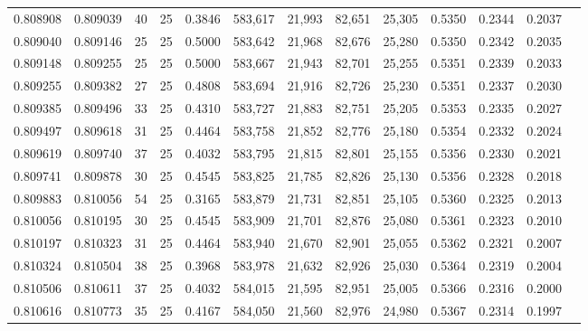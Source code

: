 \begin{tabular}{rrrrrrrrrrrrr}
0.808908 & 0.809039 &    40 &  25 &                                     0.3846 & 583,617 &  21,993 &  82,651 &  25,305 & 0.5350 & 0.2344 & 0.2037 \\
0.809040 & 0.809146 &    25 &  25 &                                     0.5000 & 583,642 &  21,968 &  82,676 &  25,280 & 0.5350 & 0.2342 & 0.2035 \\
0.809148 & 0.809255 &    25 &  25 &                                     0.5000 & 583,667 &  21,943 &  82,701 &  25,255 & 0.5351 & 0.2339 & 0.2033 \\
0.809255 & 0.809382 &    27 &  25 &                                     0.4808 & 583,694 &  21,916 &  82,726 &  25,230 & 0.5351 & 0.2337 & 0.2030 \\
0.809385 & 0.809496 &    33 &  25 &                                     0.4310 & 583,727 &  21,883 &  82,751 &  25,205 & 0.5353 & 0.2335 & 0.2027 \\
0.809497 & 0.809618 &    31 &  25 &                                     0.4464 & 583,758 &  21,852 &  82,776 &  25,180 & 0.5354 & 0.2332 & 0.2024 \\
0.809619 & 0.809740 &    37 &  25 &                                     0.4032 & 583,795 &  21,815 &  82,801 &  25,155 & 0.5356 & 0.2330 & 0.2021 \\
0.809741 & 0.809878 &    30 &  25 &                                     0.4545 & 583,825 &  21,785 &  82,826 &  25,130 & 0.5356 & 0.2328 & 0.2018 \\
0.809883 & 0.810056 &    54 &  25 &                                     0.3165 & 583,879 &  21,731 &  82,851 &  25,105 & 0.5360 & 0.2325 & 0.2013 \\
0.810056 & 0.810195 &    30 &  25 &                                     0.4545 & 583,909 &  21,701 &  82,876 &  25,080 & 0.5361 & 0.2323 & 0.2010 \\
0.810197 & 0.810323 &    31 &  25 &                                     0.4464 & 583,940 &  21,670 &  82,901 &  25,055 & 0.5362 & 0.2321 & 0.2007 \\
0.810324 & 0.810504 &    38 &  25 &                                     0.3968 & 583,978 &  21,632 &  82,926 &  25,030 & 0.5364 & 0.2319 & 0.2004 \\
0.810506 & 0.810611 &    37 &  25 &                                     0.4032 & 584,015 &  21,595 &  82,951 &  25,005 & 0.5366 & 0.2316 & 0.2000 \\
0.810616 & 0.810773 &    35 &  25 &                                     0.4167 & 584,050 &  21,560 &  82,976 &  24,980 & 0.5367 & 0.2314 & 0.1997 \\

\end{tabular}
